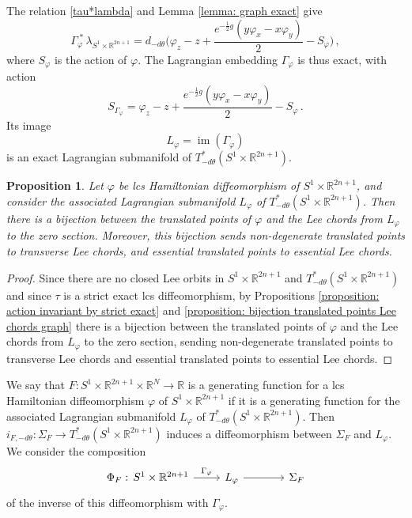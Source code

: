 \documentclass{amsart}
\DeclareMathOperator{\gr}{gr}
\DeclareMathOperator{\im}{im}
\newtheorem{prop}[thm]{Proposition}
\theoremstyle{remark}
\begin{document}
The relation \eqref{tau*lambda}
and Lemma \ref{lemma: graph exact} give
\begin{equation}\label{equation: action associated Lagrangian embedding}
\Gamma_{\varphi}^{\;\ast} \, \lambda_{S^1 \times \mathbb{R}^{2n+1}}
= d_{-d\theta} \Big( \varphi_z - z
+ \frac{ e^{-\frac{1}{2}g} (y \varphi_x - x \varphi_y) }{2} - S_{\varphi} \Big) \,,
\end{equation}
where $S_{\varphi}$ is the action of $\varphi$.
The Lagrangian embedding $\Gamma_{\varphi}$ is thus exact,
with action
$$
S_{\Gamma_{\varphi}} = \varphi_z - z
+ \frac{ e^{-\frac{1}{2}g} (y \varphi_x - x \varphi_y)}{2}  - S_{\varphi} \,.   
$$
Its image
\[
L_{\varphi} = \im (\Gamma_{\varphi})
\]
is an exact Lagrangian submanifold
of $T^{\ast}_{-d\theta} (S^1 \times \mathbb{R}^{2n+1})$.

\begin{prop}\label{proposition: bijection Lee chords translated points}
Let $\varphi$ be lcs Hamiltonian diffeomorphism of $S^1 \times \mathbb{R}^{2n+1}$,
and consider the associated Lagrangian submanifold
$L_{\varphi}$ of $T^{\ast}_{-d\theta} (S^1 \times \mathbb{R}^{2n+1})$.
Then there is a bijection between
the translated points of $\varphi$
and the Lee chords from $L_{\varphi}$ to the zero section.
Moreover,
this bijection sends non-degenerate translated points
to transverse Lee chords,
and essential translated points to essential Lee chords.
\end{prop}

\begin{proof}
Since there are no closed Lee orbits
in $S^1 \times \mathbb{R}^{2n+1}$
and $T^{\ast}_{-d\theta} (S^1 \times \mathbb{R}^{2n+1})$
and since $\tau$ is a strict exact lcs diffeomorphism,
by Propositions \ref{proposition: action invariant by strict exact}
and \ref{proposition: bijection translated points Lee chords graph}
there is a bijection between the translated points of $\varphi$
and the Lee chords from $L_{\varphi}$ to the zero section,
sending non-degenerate translated points to transverse Lee chords
and essential translated points to essential Lee chords.
\end{proof}

We say that
$F: S^1 \times \mathbb{R}^{2n+1} \times \mathbb{R}^N \rightarrow \mathbb{R}$
is a generating function for a lcs Hamiltonian diffeomorphism
$\varphi$ of $S^1 \times \mathbb{R}^{2n+1}$
if it is a generating function
for the associated Lagrangian submanifold
$L_{\varphi}$ of $T^{\ast}_{-d\theta} (S^1 \times \mathbb{R}^{2n+1})$.
Then $i_{F, -d\theta}: \Sigma_F \rightarrow
T_{-d\theta}^{\ast} (S^1 \times \mathbb{R}^{2n+1})$
induces a diffeomorphism between $\Sigma_F$ and $L_{\varphi}$.
We consider the composition
\[
\begin{tikzcd}
{\Phi_F:\, S^1 \times \mathbb{R}^{2n+1} } \arrow[r, "\Gamma_{\varphi}"]
& L_{\varphi} \arrow[r] &[3ex] \Sigma_F
\end{tikzcd}
\]
of the inverse of this diffeomorphism with $\Gamma_{\varphi}$.
\end{document}
